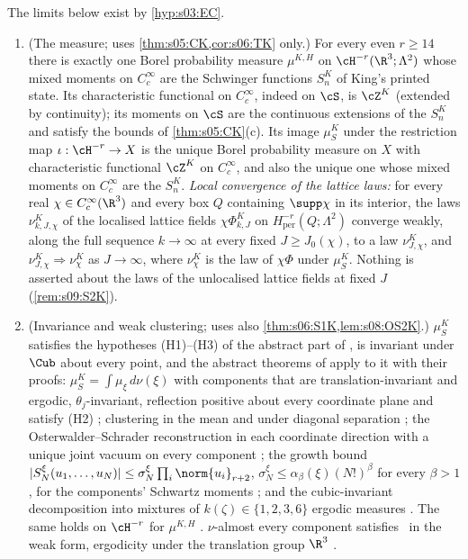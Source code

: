 \begin{theorem}\label{thm:s09:S2K}
The limits below exist by \cref{hyp:s03:EC}.
\begin{enumerate}[label=\textup{(\alph*)},leftmargin=*]
\item \textup{(The measure; uses \cref{thm:s05:CK,cor:s06:TK} only.)} For every even $r\ge14$ there is exactly one Borel probability measure $\mu^{K,H}$ on $\cH^{-r}(\R^3;\Lambda^2)$ whose mixed moments on $C^\infty_c$ are the Schwinger functions $S^K_n$ of King's printed state. Its characteristic functional on $C^\infty_c$, indeed on $\cS$, is $\cZ^K$ (extended by continuity); its moments on $\cS$ are the continuous extensions of the $S^K_n$ and satisfy the bounds of \cref{thm:s05:CK}(c). Its image $\mu^K_S$ under the restriction map $\iota:\cH^{-r}\to X$ is the unique Borel probability measure on $X$ with characteristic functional $\cZ^K$ on $C^\infty_c$, and also the unique one whose mixed moments on $C^\infty_c$ are the $S^K_n$. \emph{Local convergence of the lattice laws:} for every real $\chi\in C^\infty_c(\R^3)$ and every box $Q$ containing $\supp\chi$ in its interior, the laws $\nu^K_{k,J,\chi}$ of the localised lattice fields $\chi\Phi^K_{k,J}$ on $H^{-r}_{\mathrm{per}}(Q;\Lambda^2)$ converge weakly, along the full sequence $k\to\infty$ at every fixed $J\ge J_0(\chi)$, to a law $\nu^K_{J,\chi}$, and $\nu^K_{J,\chi}\Rightarrow\nu^K_\chi$ as $J\to\infty$, where $\nu^K_\chi$ is the law of $\chi\Phi$ under $\mu^K_S$. Nothing is asserted about the laws of the unlocalised lattice fields at fixed $J$ (\cref{rem:s09:S2K}).
\item \textup{(Invariance and weak clustering; uses also \cref{thm:s06:S1K,lem:s08:OS2K}.)} $\mu^K_S$ satisfies the hypotheses (H1)--(H3) of the abstract part of \cite{SymPhase}, is invariant under $\Cub$ about every point, and the abstract theorems of \cite{SymPhase} apply to it with their proofs: $\mu^K_S=\int\mu_\xi\,d\nu(\xi)$ with components that are translation-invariant and ergodic, $\theta_j$-invariant, reflection positive about every coordinate plane and satisfy (H2) \cite[thm:D:decomp]{SymPhase}; clustering in the mean \cite[thm:D:mean]{SymPhase} and under diagonal separation \cite[thm:D:diag]{SymPhase}; the Osterwalder--Schrader reconstruction in each coordinate direction with a unique joint vacuum on every component \cite[prop:D:recon, prop:D:fixed(iii)]{SymPhase}; the growth bound $|S^\xi_N(u_1,\dots,u_N)|\le\sigma^\xi_N\prod_i\norm{u_i}_{r+2}$, $\sigma^\xi_N\le\alpha_\beta(\xi)(N!)^\beta$ for every $\beta>1$, for the components' Schwartz moments \cite[cor:D:schwinger(iv)]{SymPhase}; and the cubic-invariant decomposition into mixtures of $k(\zeta)\in\{1,2,3,6\}$ ergodic measures \cite[add:Ohdecomp]{SymPhase}. The same holds on $\cH^{-r}$ for $\mu^{K,H}$ \cite[lem:D:hermite(d)]{SymPhase}. $\nu$-almost every component satisfies \OSf\ in the weak form, ergodicity under the translation group $\R^3$ \cite[add:OS4(iii)]{SymPhase}.

\end{enumerate}
\end{theorem}
